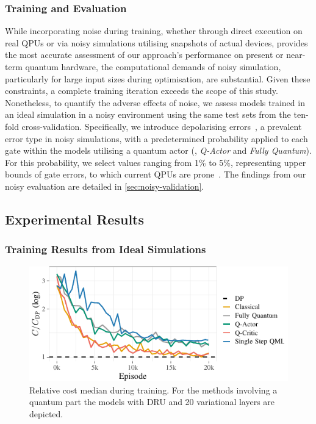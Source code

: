 \documentclass[10pt, conference]{IEEEtran}
\begin{document}
\subsubsection{Training and Evaluation}
While incorporating noise during training, whether through direct execution on real QPUs or via noisy simulations utilising snapshots of actual devices, provides the most accurate assessment of our approach's performance on present or near-term quantum hardware, the computational demands of noisy simulation, particularly for large input sizes during optimisation, are substantial.
Given these constraints, a complete training iteration exceeds the scope of this study.
Nonetheless, to quantify the adverse effects of noise, we assess models trained in an ideal simulation in a noisy environment using the same test sets from the ten-fold cross-validation.
Specifically, we introduce depolarising errors~\cite{nielsen10}, a prevalent error type in noisy simulations, with a predetermined probability applied to each gate within the models utilising a quantum actor (\ie, \emph{Q-Actor} and \emph{Fully Quantum}).
For this probability, we select values ranging from 1\% to 5\%, representing upper bounds of gate errors, to which current QPUs are prone~\cite{greiwe23}.
The findings from our noisy evaluation are detailed in \ref{sec:noisy-validation}.

\subsection{Experimental Results}
\label{sec:exp-qrl}

\subsubsection{Training Results from Ideal Simulations}

\begin{figure}[htbp]
  \includegraphics{img-gen/convergence_rejoin_q_4rels.pdf}\vspace*{-0.5em}
  \caption{Relative cost median during training. For the methods involving a quantum part the models with DRU and 20 variational layers are depicted.}
  \label{fig:rejoin-q-rels4}
\end{figure}
\end{document}

